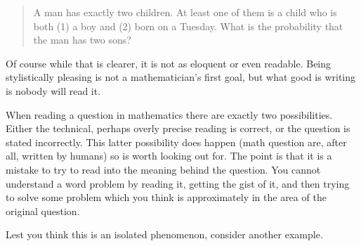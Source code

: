 \begin{quote}
 A man has exactly two children.  At least one of them is a child who is both (1) a boy and (2) born on a Tuesday.  What is the probability that the man has two sons?
\end{quote}

Of course while that is clearer, it is not as eloquent or even readable.  Being stylistically pleasing is not a mathematician's first goal, but what good is writing is nobody will read it.  

When reading a question in mathematics there are exactly two possibilities.  Either the technical, perhaps overly precise reading is correct, or the question is stated incorrectly.  This latter possibility does happen (math question are, after all, written by humans) so is worth looking out for.  The point is that it is a mistake to try to read into the meaning behind the question.  You cannot understand a word problem by reading it, getting the gist of it, and then trying to solve some problem which you think is approximately in the area of the original question.

Lest you think this is an isolated phenomenon, consider another example.

